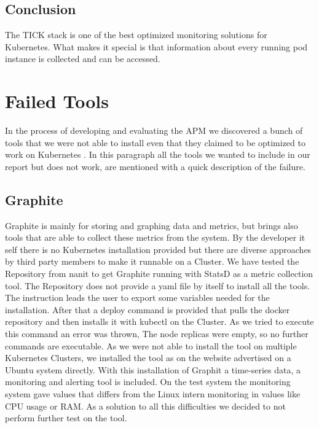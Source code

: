 \subsection{Conclusion}
The TICK stack is one of the best optimized monitoring solutions for Kubernetes. What makes it special is that information about every running pod instance is collected and can be accessed.



\section{Failed Tools}%
In the process of developing and evaluating the APM we discovered a bunch of tools that we were not able to install even that they claimed to be optimized to work on Kubernetes .
In this paragraph all the tools we wanted to include in our report but does not work, are mentioned with a quick description of the failure.
\subsection{Graphite}
Graphite is mainly for storing and graphing data and metrics, but brings also tools that are able to collect these metrics from the system. By the developer it self there is no Kubernetes installation provided but there are diverse approaches by third party members to make it runnable on a Cluster. We have tested the Repository from nanit \cite{graphite} to get Graphite running with StatsD \cite{statsd} as a metric collection tool. The Repository does not provide a yaml file by itself to install all the tools. The instruction leads the user to export some variables needed for the installation. After that a deploy command is provided that pulls the docker repository and then installs it with kubectl on the Cluster. As we tried to execute this command an error was thrown, The node replicas were empty, so no further commands are executable. As we were not able to install the tool on multiple Kubernetes Clusters, we installed the tool as on the website advertised on a Ubuntu system directly. With this installation of Graphit a time-series data, a monitoring and alerting tool is included. On the test system the monitoring system gave values that differs from the Linux intern monitoring in values like CPU usage or RAM. As a solution to all this difficulties we decided to not perform further test on the tool.

